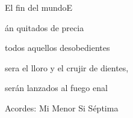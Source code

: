 \documentclass[12pt, spanish]{book}
\begin{document}
\begin{song}{El fin del mundo}{E}
        \begin{SBOpGroup}
            án quitados de  precia

            todos aquellos desobedientes

            sera el lloro y el crujir de dientes,

            serán lanzados al fuego enal
        \end{SBOpGroup}

        \ifChordBk
        \begin{SBOpGroup}
            Acordes:
            \upchord{\Em}\qquad Mi Menor \hfill
            \upchord{\Bseven}\qquad Si S\'eptima \hfill\null\break
        \end{SBOpGroup}
        \fi
    \end{song}
\end{document}
